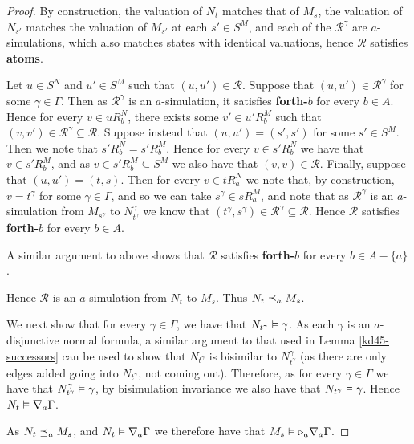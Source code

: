 \begin{proof}
By construction, the valuation of $N_t$ matches that of $M_s$, the valuation of
$N_{s'}$ matches the valuation of $M_{s'}$ at each $s' \in S^M$, and each of the
$\mathcal{R}^\gamma$ are $a$-simulations, which also matches states with
identical valuations, hence $\mathcal{R}$ satisfies {\bf atoms}.

Let $u \in S^N$ and $u' \in S^M$ such that $(u, u') \in \mathcal{R}$. Suppose
that $(u, u') \in \mathcal{R}^\gamma$ for some $\gamma \in \Gamma$. Then as
$\mathcal{R}^\gamma$ is an $a$-simulation, it satisfies {\bf forth-$b$} for
every $b \in A$. Hence for every $v \in uR^N_b$, there exists some $v' \in
u'R^M_b$ such that $(v, v') \in \mathcal{R}^\gamma \subseteq \mathcal{R}$.
Suppose instead that $(u, u') = (s', s')$ for some $s' \in S^M$. Then we note
that $s'R^N_b = s'R^M_b$. Hence for every $v \in s'R^N_b$ we have that $v \in
s'R^M_b$, and as $v \in s'R^M_b \subseteq S^M$ we also have that $(v, v) \in
\mathcal{R}$. Finally, suppose that $(u, u') = (t, s)$. Then for every $v \in
tR^N_a$ we note that, by construction, $v = t^\gamma$ for some $\gamma \in
\Gamma$, and so we can take $s^\gamma \in sR^M_a$, and note that as
$\mathcal{R}^\gamma$ is an $a$-simulation from $M_{s^\gamma}$ to
$N^\gamma_{t^\gamma}$ we know that $(t^\gamma, s^\gamma) \in \mathcal{R}^\gamma
\subseteq \mathcal{R}$. Hence $\mathcal{R}$ satisfies {\bf forth-$b$} for every
$b \in A$.

A similar argument to above shows that $\mathcal{R}$ satisfies {\bf forth-$b$}
for every $b \in A - \{a\}$.

Hence $\mathcal{R}$ is an $a$-simulation from $N_t$ to $M_s$. Thus $N_t
\preceq_a M_s$. 

We next show that for every $\gamma \in \Gamma$, we have that $N_{t^\gamma}
\vDash \gamma$. As each $\gamma$ is an $a$-disjunctive normal formula, a
similar argument to that used in Lemma \ref{kd45-successors} can be used to show
that $N_{t^\gamma}$ is bisimilar to $N^\gamma_{t^\gamma}$ (as there are only
edges added going into $N_{t^\gamma}$, not coming out). Therefore, as for every
$\gamma \in \Gamma$ we have that $N^\gamma_{t^\gamma} \vDash \gamma$, by
bisimulation invariance we also have that $N_{t^\gamma} \vDash \gamma$. Hence
$N_t \vDash \nabla_a \Gamma$.

As $N_t \preceq_a M_s$, and $N_t \vDash \nabla_a \Gamma$ we therefore
have that $M_s \vDash {\ensuremath{\mathopen{\triangleright}}}_a \nabla_a \Gamma$.


\end{proof}
